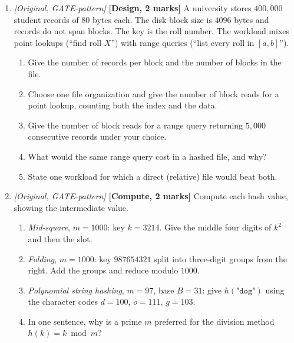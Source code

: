 \documentclass[11pt]{article}
\begin{document}
\begin{enumerate}
\item[\textbf{Q9}] \textit{[Original, GATE-pattern]} \textbf{[Design, 2 marks]} A university stores $400{,}000$ student records of $80$ bytes each. The disk block size is $4096$ bytes and records do not span blocks. The key is the roll number. The workload mixes point lookups (``find roll $X$'') with range queries (``list every roll in $[a,b]$'').
\begin{enumerate}
  \item[(a)] Give the number of records per block and the number of blocks in the file.
  \item[(b)] Choose one file organization and give the number of block reads for a point lookup, counting both the index and the data.
  \item[(c)] Give the number of block reads for a range query returning $5{,}000$ consecutive records under your choice.
  \item[(d)] What would the same range query cost in a hashed file, and why?
  \item[(e)] State one workload for which a direct (relative) file would beat both.
\end{enumerate}

\item[\textbf{Q10}] \textit{[Original, GATE-pattern]} \textbf{[Compute, 2 marks]} Compute each hash value, showing the intermediate value.
\begin{enumerate}
  \item[(a)] \emph{Mid-square}, $m=1000$: key $k=3214$. Give the middle four digits of $k^2$ and then the slot.
  \item[(b)] \emph{Folding}, $m=1000$: key $987654321$ split into three-digit groups from the right. Add the groups and reduce modulo $1000$.
  \item[(c)] \emph{Polynomial string hashing}, $m=97$, base $B=31$: give $h(\texttt{"dog"})$ using the character codes $d=100$, $o=111$, $g=103$.
  \item[(d)] In one sentence, why is a prime $m$ preferred for the division method $h(k)=k \bmod m$?
\end{enumerate}
\end{enumerate}
\end{document}
